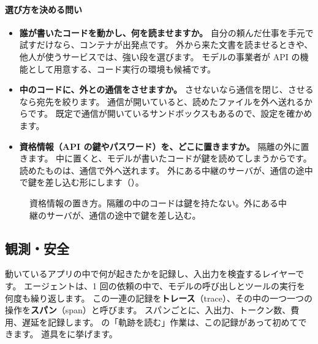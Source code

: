 \paragraph{選び方を決める問い}
\begin{itemize}[nosep,beginpenalty=10000]
\item \textbf{誰が書いたコードを動かし、何を読ませますか。}
  自分の頼んだ仕事を手元で試すだけなら、コンテナが出発点です。
  外から来た文書を読ませるときや、他人が使うサービスでは、強い段を選びます。
  モデルの事業者が API の機能として用意する、コード実行の環境も候補です。
\item \textbf{中のコードに、外との通信をさせますか。}
  させないなら通信を閉じ、させるなら宛先を絞ります。
  通信が開いていると、読めたファイルを外へ送れるからです。
  既定で通信が開いているサンドボックスもあるので、設定を確かめます。
\item \textbf{資格情報（API の鍵やパスワード）を、どこに置きますか。}
  隔離の外に置きます。
  中に置くと、モデルが書いたコードが鍵を読めてしまうからです。読めたものは、通信で外へ送れます。
  外にある中継のサーバが、通信の途中で鍵を差し込む形にします（）。
\end{itemize}

\begin{figure}[htbp]
\centering
{}
\caption{資格情報の置き方。隔離の中のコードは鍵を持たない。外にある中継のサーバが、通信の途中で鍵を差し込む。}
\label{fig:tm-relay}
\end{figure}

\subsection{観測・安全}\label{sec:tm-observe}

動いているアプリの中で何が起きたかを記録し、入出力を検査するレイヤーです。
エージェントは、1 回の依頼の中で、モデルの呼び出しとツールの実行を何度も繰り返します。
この一連の記録を\textbf{トレース}（trace）、その中の一つ一つの操作を\textbf{スパン}（span）と呼びます。
スパンごとに、入出力、トークン数、費用、遅延を記録します。
の「軌跡を読む」作業は、この記録があって初めてできます。
道具をに挙げます。

